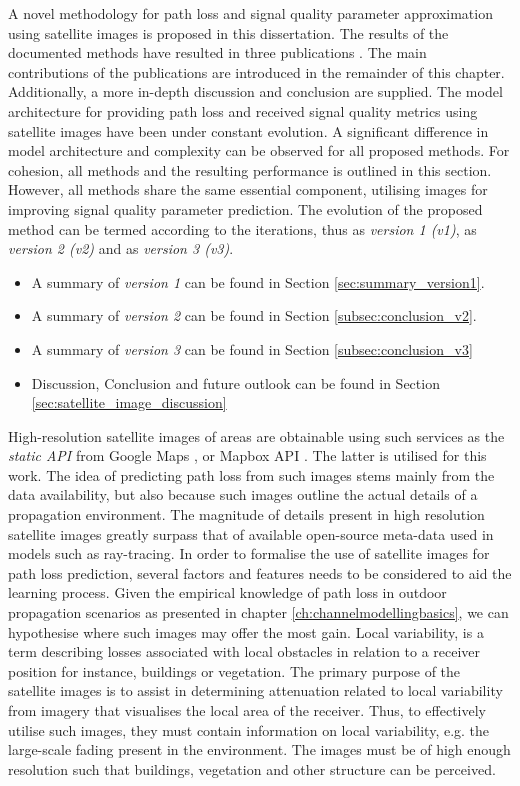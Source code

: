 A novel methodology for path loss and signal quality parameter approximation using satellite images is proposed in this dissertation. The results of the documented methods have resulted in three publications \cite{Thrane2018DriveApproximation, Thrane020ModelAidedDeepLearning, Thrane2020DeepKnowledge}. The main contributions of the publications are introduced in the remainder of this chapter. Additionally, a more in-depth discussion and conclusion are supplied. The model architecture for providing path loss and received signal quality metrics using satellite images have been under constant evolution. A significant difference in model architecture and complexity can be observed for all proposed methods.  For cohesion, all methods and the resulting performance is outlined in this section. However, all methods share the same essential component, utilising images for improving signal quality parameter prediction. The evolution of the proposed method can be termed according to the iterations, thus \cite{Thrane2018DriveApproximation} as \emph{version 1 (v1)}, \cite{Thrane020ModelAidedDeepLearning} as \emph{version 2 (v2)} and \cite{Thrane2020DeepKnowledge} as \emph{version 3 (v3)}. 
\begin{itemize}
    \item A summary of \emph{version 1} can be found in Section \ref{sec:summary_version1}. 
    \item A summary of \emph{version 2} can be found in Section \ref{subsec:conclusion_v2}. 
    \item A summary of \emph{version 3} can be found in Section \ref{subsec:conclusion_v3}
    \item Discussion, Conclusion and future outlook can be found in Section \ref{sec:satellite_image_discussion}
\end{itemize}
\noindent
High-resolution satellite images of areas are obtainable using such services as the \emph{static API} from Google Maps \cite{GoogleAPI}, or Mapbox API \cite{MapboxWebsite}. The latter is utilised for this work. The idea of predicting path loss from such images stems mainly from the data availability, but also because such images outline the actual details of a propagation environment. The magnitude of details present in high resolution satellite images greatly surpass that of available open-source meta-data used in models such as ray-tracing. In order to formalise the use of satellite images for path loss prediction, several factors and features needs to be considered to aid the learning process. Given the empirical knowledge of path loss in outdoor propagation scenarios as presented in chapter \ref{ch:channelmodellingbasics}, we can hypothesise where such images may offer the most gain. Local variability, is a term describing losses associated with local obstacles in relation to a receiver position for instance, buildings or vegetation. The primary purpose of the satellite images is to assist in determining attenuation related to local variability from imagery that visualises the local area of the receiver. Thus, to effectively utilise such images, they must contain information on local variability, e.g. the large-scale fading present in the environment. The images must be of high enough resolution such that buildings, vegetation and other structure can be perceived.


